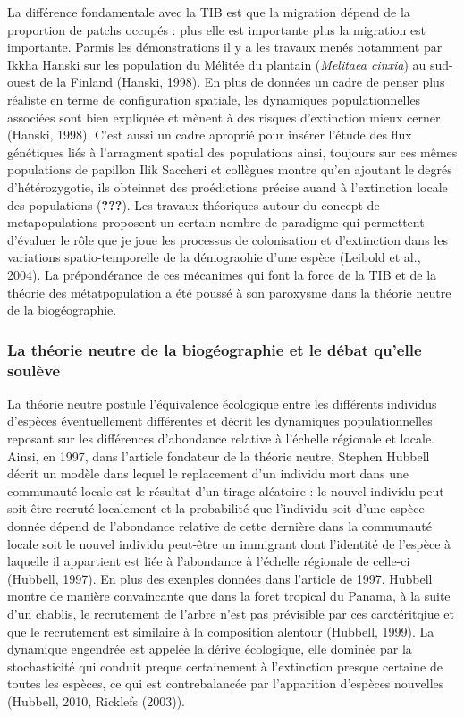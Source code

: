 La différence fondamentale avec la TIB est que la migration dépend de la
proportion de patchs occupés : plus elle est importante plus la
migration est importante. Parmis les démonstrations il y a les travaux
menés notamment par Ikkha Hanski sur les population du Mélitée du
plantain (\emph{Melitaea cinxia}) au sud-ouest de la Finland (Hanski,
1998). En plus de données un cadre de penser plus réaliste en terme de
configuration spatiale, les dynamiques populationnelles associées sont
bien expliquée et mènent à des risques d'extinction mieux cerner
(Hanski, 1998). C'est aussi un cadre aproprié pour insérer l'étude des
flux génétiques liés à l'arragment spatial des populations ainsi,
toujours sur ces mêmes populations de papillon Ilik Saccheri et
collègues montre qu'en ajoutant le degrés d'hétérozygotie, ils obteinnet
des proédictions précise auand à l'extinction locale des populations
({\textbf{???}}). Les travaux théoriques autour du concept de
metapopulations proposent un certain nombre de paradigme qui permettent
d'évaluer le rôle que je joue les processus de colonisation et
d'extinction dans les variations spatio-temporelle de la démograohie
d'une espèce (Leibold et al., 2004). La prépondérance de ces mécanimes
qui font la force de la TIB et de la théorie des métatpopulation a été
poussé à son paroxysme dans la théorie neutre de la biogéographie.

\subsubsection*{La théorie neutre de la biogéographie et le débat
qu'elle
soulève}\label{la-thuxe9orie-neutre-de-la-bioguxe9ographie-et-le-duxe9bat-quelle-souluxe8ve}

La théorie neutre postule l'équivalence écologique entre les différents
individus d'espèces éventuellement différentes et décrit les dynamiques
populationnelles reposant sur les différences d'abondance relative à
l'échelle régionale et locale. Ainsi, en 1997, dans l'article fondateur
de la théorie neutre, Stephen Hubbell décrit un modèle dans lequel le
replacement d'un individu mort dans une communauté locale est le
résultat d'un tirage aléatoire : le nouvel individu peut soit être
recruté localement et la probabilité que l'individu soit d'une espèce
donnée dépend de l'abondance relative de cette dernière dans la
communauté locale soit le nouvel individu peut-être un immigrant dont
l'identité de l'espèce à laquelle il appartient est liée à l'abondance à
l'échelle régionale de celle-ci (Hubbell, 1997). En plus des exenples
données dans l'article de 1997, Hubbell montre de manière convaincante
que dans la foret tropical du Panama, à la suite d'un chablis, le
recrutement de l'arbre n'est pas prévisible par ces carctéritqiue et que
le recrutement est similaire à la composition alentour (Hubbell, 1999).
La dynamique engendrée est appelée la dérive écologique, elle dominée
par la stochasticité qui conduit preque certainement à l'extinction
presque certaine de toutes les espèces, ce qui est contrebalancée par
l'apparition d'espèces nouvelles (Hubbell, 2010, Ricklefs (2003)).

